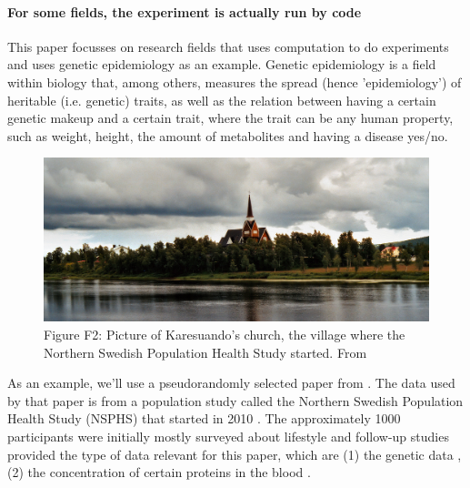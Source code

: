 \paragraph{For some fields, the experiment is actually run by code}

This paper focusses on research fields that uses computation
to do experiments and uses genetic epidemiology as an example.
Genetic epidemiology is a field within biology that, among 
others, measures the spread (hence 'epidemiology') 
of heritable (i.e. genetic) traits, as well as the relation
between having a certain genetic makeup and a certain trait,
where the trait can be any human property, such as weight, height,
the amount of metabolites and having a disease yes/no.

\begin{figure}[!htbp]
  \centering
  \includegraphics[width=\linewidth]{Karesuando_church.jpg}
  \caption{
    Figure F2: Picture of Karesuando's church,
    the village where the Northern Swedish Population
    Health Study started.
    From \cite{hopfner2005}
  }
  \label{fig:karesuando_church}
\end{figure}

As an example, we'll use a pseudorandomly selected paper
from \cite{ahsan2017relative}. The data used by that paper is
from a population study called the Northern Swedish Population
Health Study (NSPHS) that started in 2010 \cite{igl2010northern}. 
The approximately 1000 participants were initially mostly surveyed
about lifestyle \cite{igl2010northern} and follow-up studies
provided the type of data relevant for this paper, 
which are (1) the genetic data \cite{johansson2013identification},
(2) the concentration of certain proteins in the 
blood \cite{enroth2014strong,enroth2015effect}.

